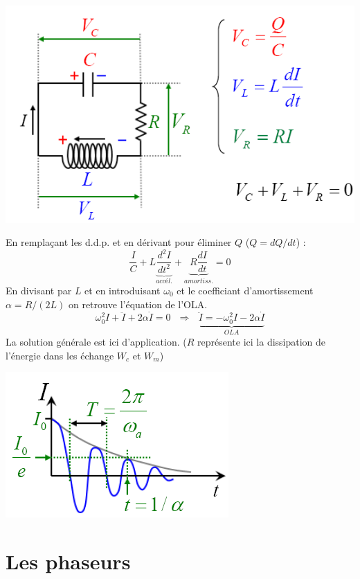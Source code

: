 \documentclass	[11pt, a4paper, openany]{book}
\begin{document}
	\begin{center}
		\includegraphics[scale=0.45]{oo/image9.png}
	\end{center}
	En remplaçant les d.d.p. et en dérivant pour éliminer $Q$ ($Q = dQ/dt$) :
	\begin{equation}
		\frac{I}{C} + L \underbrace{\frac{d^2I}{dt^2}}_{accél.} + \underbrace{R\frac{dI}{dt}}_{amortiss.} = 0
	\end{equation}
	En divisant par $L$ et en introduisant $\omega_0$ et le coefficiant d'amortissement $\alpha = R/(2L)$ on retrouve l'équation de l'OLA.
	\begin{equation}
		\omega_0^2I + \ddot{I} + 2\alpha \dot{I} = 0\ \ \ \Rightarrow\ \ \ \underbrace{\ddot{I} = -\omega_0^2I - 2\alpha\dot{I}}_{OLA}
	\end{equation}
	La solution générale est ici d'application. ($R$ représente ici la dissipation de l'énergie dans les échange $W_c$ et $W_m$)
	\begin{center}
		\includegraphics[scale=0.45]{oo/image10.png}
	\end{center}
	
	\section{Les phaseurs}
\end{document}
